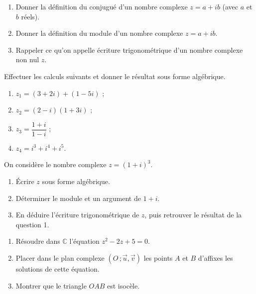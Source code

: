 \documentclass[11pt]{article}
\newcounter{popsec}
\newcounter{popsub}
\newcommand{\courssub}[1]{%
  \stepcounter{popsub}%
  \par\vspace{9pt}\noindent{\popxbold\fontsize{11.5}{13}\selectfont\color{popink}{\color{poporange}\thepopsec.\thepopsub}\hspace{6pt}#1}\par\nopagebreak\vspace{4pt}
}
\begin{document}
\begin{exercice}[Définitions]
\begin{enumerate}
\item Donner la définition du conjugué d'un nombre complexe $z = a + ib$ (avec $a$ et $b$ réels).
\item Donner la définition du module d'un nombre complexe $z = a + ib$.
\item Rappeler ce qu'on appelle écriture trigonométrique d'un nombre complexe non nul $z$.
\end{enumerate}
\end{exercice}

\begin{exercice}
Effectuer les calculs suivants et donner le résultat sous forme algébrique.
\begin{enumerate}
\item $z_1 = (3 + 2i) + (1 - 5i)$ ;
\item $z_2 = (2 - i)(1 + 3i)$ ;
\item $z_3 = \dfrac{1 + i}{1 - i}$ ;
\item $z_4 = i^3 + i^4 + i^5$.
\end{enumerate}
\end{exercice}

\courssub{Je m'entraîne}

\begin{exercice}
On considère le nombre complexe $z = (1 + i)^3$.
\begin{enumerate}
\item Écrire $z$ sous forme algébrique.
\item Déterminer le module et un argument de $1 + i$.
\item En déduire l'écriture trigonométrique de $z$, puis retrouver le résultat de la question 1.
\end{enumerate}
\end{exercice}

\begin{exercice}
\begin{enumerate}
\item Résoudre dans $\mathbb{C}$ l'équation $z^2 - 2z + 5 = 0$.
\item Placer dans le plan complexe $(O\,;\vec{u},\vec{v})$ les points $A$ et $B$ d'affixes les solutions de cette équation.
\item Montrer que le triangle $OAB$ est isocèle.
\end{enumerate}
\end{exercice}
\end{document}
